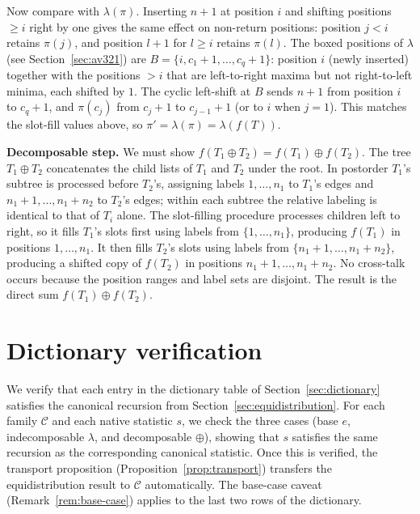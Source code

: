 \documentclass[a4paper,11pt]{article}
\theoremstyle{definition}
\begin{document}
Now compare with $\lambda(\pi)$. Inserting $n{+}1$ at
position $i$ and shifting positions $\geq i$ right by
one gives the same effect on non-return positions:
position $j < i$ retains $\pi(j)$, and position $l{+}1$
for $l \geq i$ retains $\pi(l)$. The boxed positions of
$\lambda$ (see Section~\ref{sec:av321}) are
$B = \{i, c_1{+}1, \ldots, c_q{+}1\}$: position $i$
(newly inserted) together with the positions $> i$
that are left-to-right maxima but not right-to-left
minima, each shifted by $1$. The cyclic
left-shift at $B$ sends $n{+}1$ from position $i$ to
$c_q{+}1$, and $\pi(c_j)$ from $c_j{+}1$ to
$c_{j-1}{+}1$ (or to $i$ when $j = 1$). This matches
the slot-fill values above, so
$\pi' = \lambda(\pi) = \lambda(f(T))$.

\textbf{Decomposable step.}
We must show
$f(T_1 \oplus T_2) = f(T_1) \oplus f(T_2)$.
The tree $T_1 \oplus T_2$ concatenates the child lists
of $T_1$ and $T_2$ under the root. In postorder $T_1$'s
subtree is processed before $T_2$'s, assigning labels
$1, \ldots, n_1$ to $T_1$'s edges and
$n_1{+}1, \ldots, n_1{+}n_2$ to $T_2$'s edges; within
each subtree the relative labeling is identical to that
of $T_i$ alone. The slot-filling procedure processes children left
to right, so it fills $T_1$'s slots first using labels
from $\{1, \ldots, n_1\}$, producing $f(T_1)$ in
positions $1, \ldots, n_1$. It then fills $T_2$'s slots
using labels from $\{n_1{+}1, \ldots, n_1{+}n_2\}$,
producing a shifted copy of $f(T_2)$ in positions
$n_1{+}1, \ldots, n_1{+}n_2$. No cross-talk occurs
because the position ranges and label sets are disjoint.
The result is the direct sum $f(T_1) \oplus f(T_2)$.

\section{Dictionary verification}\label{sec:dict-verify}

We verify that each entry in the dictionary table
of Section~\ref{sec:dictionary} satisfies the canonical recursion from
Section~\ref{sec:equidistribution}. For each family
$\mathcal{C}$ and each native statistic $s$, we check the
three cases (base $e$, indecomposable $\lambda$, and
decomposable $\oplus$), showing that $s$ satisfies the
same recursion as the corresponding canonical
statistic. Once
this is verified, the transport proposition
(Proposition~\ref{prop:transport})
transfers the equidistribution result to $\mathcal{C}$
automatically. The base-case caveat
(Remark~\ref{rem:base-case}) applies to the last two
rows of the dictionary.
\end{document}

